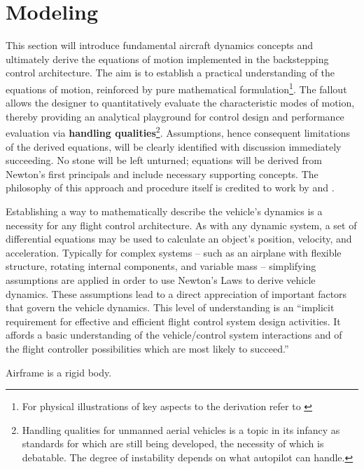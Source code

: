 \documentclass[12pt]{ucthesis}
\begin{document}
\section{Modeling}
\label{sec: modeling} %
This section will introduce fundamental aircraft dynamics concepts and ultimately derive the equations of motion implemented in the backstepping control architecture. The aim is to establish a practical understanding of the equations of motion, reinforced by pure mathematical formulation\footnote{For physical illustrations of key aspects to the derivation refer to \citet[Chp. 4]{McRuer1973}}. The fallout allows the designer to quantitatively evaluate the characteristic modes of motion, thereby providing an analytical playground for control design and performance evaluation via \textbf{handling qualities}\footnote{Handling qualities for unmanned aerial vehicles is a topic in its infancy as standards for which are still being developed, the necessity of which is debatable. The degree of instability depends on what autopilot can handle.}. Assumptions, hence consequent limitations of the derived equations, will be clearly identified with discussion immediately succeeding. No stone will be left unturned; equations will be derived from Newton's first principals and include necessary supporting concepts. The philosophy of this approach and procedure itself is credited to work by \citep{Perkins1949} and \citep{McRuer1973}.

Establishing a way to mathematically describe the vehicle's dynamics is a necessity for any flight control architecture. As with any dynamic system, a set of differential equations may be used to calculate an object's position, velocity, and acceleration. Typically for complex systems -- such as an airplane with flexible structure, rotating internal components, and variable mass -- simplifying assumptions are applied in order to use Newton's Laws to derive vehicle dynamics. These assumptions lead to a direct appreciation of important factors that govern the vehicle dynamics. This level of understanding is an ``implicit requirement for effective and efficient flight control system design activities. It affords a basic understanding of the vehicle/control system interactions and of the flight controller possibilities which are most likely to succeed.'' \citet{McRuer1973}

	\begin{ass}
	Airframe is a rigid body.
	\label{ass: rigid}
	\end{ass}
\end{document}
